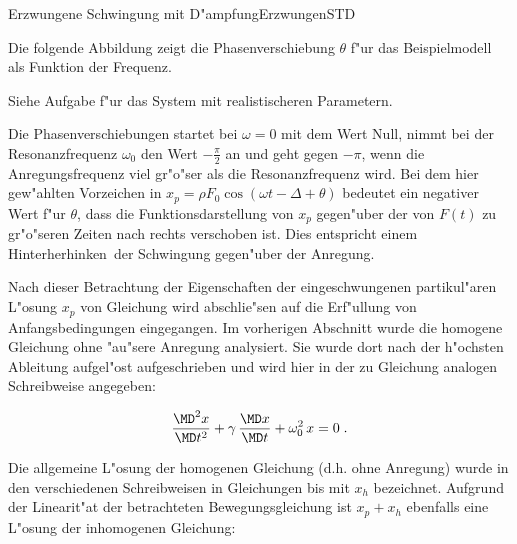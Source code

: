 \begin{MXContent}{Erzwungene Schwingung mit D"ampfung}{Erzwungen}{STD}
\begin{MExample}
Die folgende Abbildung zeigt die Phasenverschiebung $\theta$ f"ur das Beispielmodell als Funktion der Frequenz. 

\begin{center}
  \end{center}

\end{MExample}

Siehe Aufgabe 
f"ur das System mit realistischeren Parametern.

Die Phasenverschiebungen startet bei $\omega=0$ mit dem Wert Null, nimmt bei der Resonanzfrequenz $\omega_0$ den Wert $-\frac{\pi}{2}$ an und geht gegen $-\pi$, wenn die Anregungsfrequenz viel gr"o"ser als die Resonanzfrequenz wird. Bei dem hier gew"ahlten Vorzeichen in $x_p = \rho F_0 \cos\left(\omega t - \Delta + \theta \right)$ bedeutet ein negativer Wert f"ur $\theta$, dass die Funktionsdarstellung von $x_p$ gegen"uber der von $F(t)$ zu gr"o"seren Zeiten nach rechts verschoben ist. Dies entspricht einem \glqq Hinterherhinken\grqq\ der Schwingung gegen"uber der Anregung. 

Nach dieser Betrachtung der Eigenschaften der eingeschwungenen partikul"aren L"osung $x_p$ von Gleichung  wird abschlie"sen auf die Erf"ullung von Anfangsbedingungen eingegangen. Im vorherigen Abschnitt wurde die homogene Gleichung  ohne "au"sere Anregung analysiert. Sie wurde dort nach der h"ochsten Ableitung aufgel"ost aufgeschrieben und wird hier in der zu Gleichung  analogen Schreibweise angegeben:

\begin{equation}%
  \frac{\MD^2 x }{\MD t^2} + \gamma \, \frac{\MD x }{\MD t} + \omega_0^2\,x = 0  \; .
\end{equation}

Die allgemeine L"osung der homogenen Gleichung (d.h. ohne Anregung) wurde in den verschiedenen Schreibweisen in Gleichungen  bis  mit $x_h$ bezeichnet. Aufgrund der Linearit"at der betrachteten Bewegungsgleichung ist $x_p + x_h$ ebenfalls eine L"osung der inhomogenen Gleichung:


\end{MXContent}
